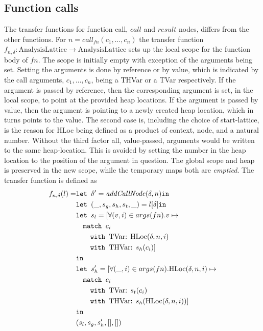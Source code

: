 \subsection{Function calls}
The transfer functions for function call, $\mathit{call}$ and $\mathit{result}$ nodes, differs from the other functions. For $n = \mathit{call}_{fn}(c_1,\dots,c_n)$ the transfer function $f_{n,\delta} : \text{AnalysisLattice} \rightarrow \text{AnalysisLattice}$ sets up the local scope for the function body of $fn$. The scope is initially empty with exception of the arguments being set. Setting the arguments is done by reference or by value, which is indicated by the call arguments, $c_1, \dots, c_n$, being a { THVar} or a { TVar} respectively. If the argument is passed by reference, then the corresponding argument is set, in the local scope, to point at the provided heap locations. If the argument is passed by value, then the argument is pointing to a newly created heap location, which in turns points to the value. The second case is, including the choice of start-lattice, is the reason for { HLoc} being defined as a product of context, node, and a natural number. Without the third factor all, value-passed, arguments would be written to the same heap-location. This is avoided by setting the number in the heap location to the position of the argument in question. The global scope and heap is preserved in the new scope, while the temporary maps both are \emph{emptied}. The transfer function is defined as
\begin{align}
      f_{n,\delta}(l) =     &\texttt{let } \delta' = \mathit{addCallNode}(\delta, n) \texttt{in }\notag\\
                            &\texttt{let } (\_, s_g, s_h,s_t, \_) = l[\delta] \texttt{in }\notag\\
                            &\texttt{let } s_l = [\forall (v, i) \in args(fn). v \mapsto \notag\\
                            &\quad\texttt{match }c_i\notag\\
                            &\quad\quad\texttt{with }\text{TVar}\text{: } \text{HLoc}(\delta, n, i)\notag\\
                            &\quad\quad\texttt{with }\text{THVar}\text{: } s_h(c_i)]\notag\\
                            & \texttt{in }\notag\\
                            &\texttt{let } s_h' = [\forall (\_, i) \in args(fn). \text{HLoc}(\delta, n, i) \mapsto \notag\\
                            &\quad\texttt{match }c_i\notag\\
                            &\quad\quad\texttt{with }\text{TVar}\text{: } s_t(c_i)\notag\\
                            &\quad\quad\texttt{with }\text{THVar}\text{: } s_h(\text{HLoc}(\delta, n, i))]\notag\\
                            & \texttt{in }\notag\\
                            &(s_l, s_g, s_h',[], [])
\end{align}
